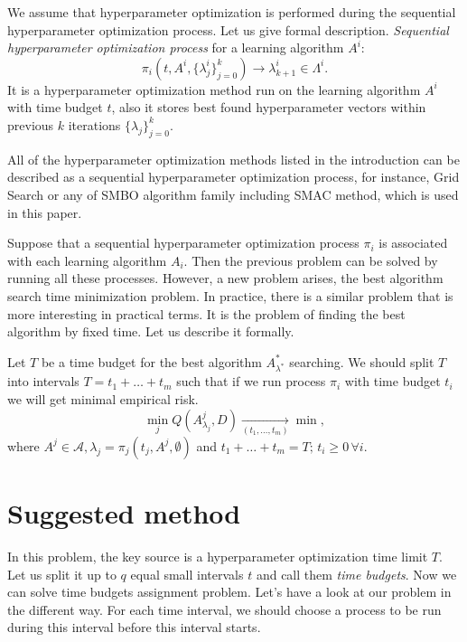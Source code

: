 \documentclass{svproc}
\begin{document}
We assume that hyperparameter optimization is performed during the sequential hyperparameter optimization process. Let us give formal description. \emph{Sequential hyperparameter optimization process} for a learning algorithm $A^i$: 
\[
\pi_i(t, A^i, \{\lambda^i_j\}^k_{j=0}) \rightarrow \lambda^i_{k+1} \in \Lambda^i.
\]
It is a hyperparameter optimization method run on the learning algorithm $A^i$ with time budget $t$, also it stores best found hyperparameter vectors within previous $k$ iterations $\{\lambda_j\}^k_{j=0}$. 

All of the hyperparameter optimization methods listed in the introduction can be described as a sequential hyperparameter optimization process, for instance, Grid Search or any of SMBO algorithm family including SMAC method, which is used in this paper. 
 
Suppose that a sequential hyperparameter optimization process $\pi_i$ is associated with each learning algorithm $A_i.$ Then the previous problem can be solved by running all these processes. However, a new problem arises, the best algorithm search time minimization problem. In practice, there is a similar problem that is more interesting in practical terms. It is the problem of finding the best algorithm by fixed time. Let us describe it formally.

Let $T$ be a time budget for the best algorithm $A^*_{\lambda^*}$ searching. We should split $T$ into intervals $T = t_1 + \dots + t_m$ such that if we run process $\pi_i$ with time budget $t_i$ we will get minimal empirical risk.
\[
\min_{j} Q(A_{\lambda_j}^j, D)\xrightarrow
[\left(t_1, \ldots, t_m\right)]{} \min,
\]
where $A^j \in \mathscr{A}, \lambda_j=\pi_j(t_j, A^j, \emptyset)$ and ${t_1+\ldots+t_m=T;\, t_i\ge 0\, \forall i}.$


\section{Suggested method}
\label{sec:suggest}

In this problem, the key source is a hyperparameter optimization time limit $T$. Let us split it up to $q$ equal small intervals $t$ and call them \emph{time budgets}. Now we can solve time budgets assignment problem. Let’s have a look at our problem in the different way. For each time interval, we should choose a process to be run during this interval before this interval starts.
\end{document}
